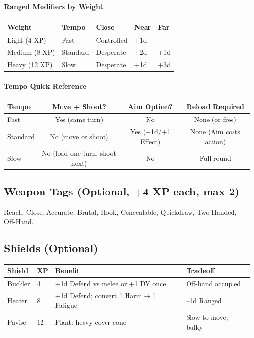 \paragraph{Ranged Modifiers by Weight}
\begin{center}
\begin{tabular}{lllll}
\toprule
\textbf{Weight} & \textbf{Tempo} & \textbf{Close} & \textbf{Near} & \textbf{Far} \\
\midrule
Light (4 XP) & Fast & Controlled & +1d & --- \\
Medium (8 XP) & Standard & Desperate & +2d & +1d \\
Heavy (12 XP) & Slow & Desperate & +1d & +3d \\
\bottomrule
\end{tabular}
\end{center}

\paragraph{Tempo Quick Reference}
\begin{center}
\begin{tabular}{lccc}
\toprule
\textbf{Tempo} & \textbf{Move + Shoot?} & \textbf{Aim Option?} & \textbf{Reload Required} \\
\midrule
Fast      & Yes (same turn) & No      & None (or free) \\
Standard  & No (move or shoot) & Yes (+1d/+1 Effect) & None (Aim costs action) \\
Slow      & No (load one turn, shoot next) & No & Full round \\
\bottomrule
\end{tabular}
\end{center}

\subsection{Weapon Tags (Optional, +4 XP each, max 2)}
\label{sec:weapon-tags}
Reach, Close, Accurate, Brutal, Hook, Concealable, Quickdraw, Two-Handed, Off-Hand.

\subsection{Shields (Optional)}
\label{sec:shields}
\begin{center}
\begin{tabular}{llll}
\toprule
\textbf{Shield} & \textbf{XP} & \textbf{Benefit} & \textbf{Tradeoff} \\
\midrule
Buckler & 4 & +1d Defend vs melee or +1 DV once & Off-hand occupied \\
Heater  & 8 & +1d Defend; convert 1 Harm$\rightarrow$1 Fatigue & --1d Ranged \\
Pavise  & 12 & Plant: heavy cover cone & Slow to move; bulky \\
\bottomrule
\end{tabular}
\end{center}


